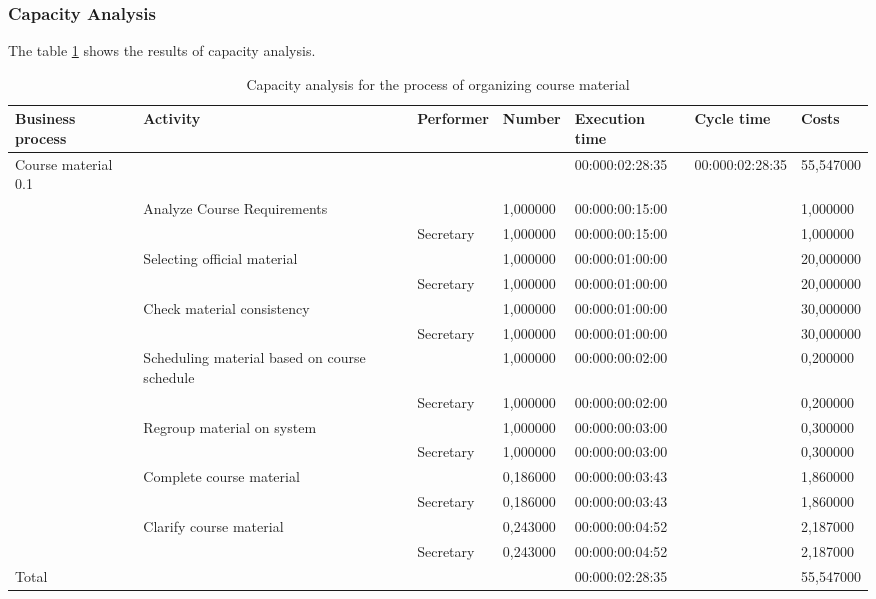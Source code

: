 \subsubsection{Capacity Analysis}
The table \ref{2tab:material} shows the results of capacity analysis.

\begin{landscape}
\centering
\begin{table}
{\tiny
\begin{tabular}{|l|l|l|l|l|l|l|}
Business process&Activity&Performer&Number&Execution time&Cycle
time&Costs\\
\hline
Course material 0.1&&&&00:000:02:28:35&00:000:02:28:35&55,547000\\
\hline
&Analyze Course Requirements &&1,000000&00:000:00:15:00&&1,000000\\
\hline
&&Secretary &1,000000&00:000:00:15:00&&1,000000\\
\hline
&Selecting official material &&1,000000&00:000:01:00:00&&20,000000\\
\hline
&&Secretary &1,000000&00:000:01:00:00&&20,000000\\
\hline
&Check material consistency &&1,000000&00:000:01:00:00&&30,000000\\
\hline
&&Secretary &1,000000&00:000:01:00:00&&30,000000\\
\hline
&Scheduling material based on course schedule &&1,000000&00:000:00:02:00&&0,200000\\
\hline
&&Secretary &1,000000&00:000:00:02:00&&0,200000\\
\hline
&Regroup material on system &&1,000000&00:000:00:03:00&&0,300000\\
\hline
&&Secretary &1,000000&00:000:00:03:00&&0,300000\\
\hline
&Complete course material &&0,186000&00:000:00:03:43&&1,860000\\
\hline
&&Secretary &0,186000&00:000:00:03:43&&1,860000\\
\hline
&Clarify course material &&0,243000&00:000:00:04:52&&2,187000\\
\hline
&&Secretary &0,243000&00:000:00:04:52&&2,187000\\
\hline
Total&&&&00:000:02:28:35&&55,547000\\
\hline
\end{tabular}
}
\caption{Capacity analysis for the process of organizing course material} 
\label{2tab:material}
\end{table}
\end{landscape}




